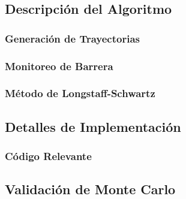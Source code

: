 
\subsection{Descripción del Algoritmo}


\subsubsection{Generación de Trayectorias}


\subsubsection{Monitoreo de Barrera}


\subsubsection{Método de Longstaff-Schwartz}


\subsection{Detalles de Implementación}


\subsubsection{Código Relevante}


\subsection{Validación de Monte Carlo}


